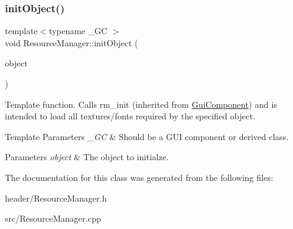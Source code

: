 \subsubsection{\texorpdfstring{init\+Object()}{initObject()}}
{\footnotesize\ttfamily template$<$typename \+\_\+\+GC $>$ \\
void Resource\+Manager\+::init\+Object (\begin{DoxyParamCaption}\item[{\+\_\+\+GC \&}]{object }\end{DoxyParamCaption})\hspace{0.3cm}{\ttfamily [inline]}}



Template function. Calls rm\+\_\+init (inherited from \mbox{\hyperlink{class_gui_component}{Gui\+Component}}) and is intended to load all textures/fonts required by the specified object. 


\begin{DoxyTemplParams}{Template Parameters}
{\em \+\_\+\+GC} & Should be a G\+UI component or derived class. \\
\hline
\end{DoxyTemplParams}

\begin{DoxyParams}{Parameters}
{\em object} & The object to initialze. \\
\hline
\end{DoxyParams}


The documentation for this class was generated from the following files\+:\begin{DoxyCompactItemize}
\item 
header/Resource\+Manager.\+h\item 
src/Resource\+Manager.\+cpp\end{DoxyCompactItemize}
